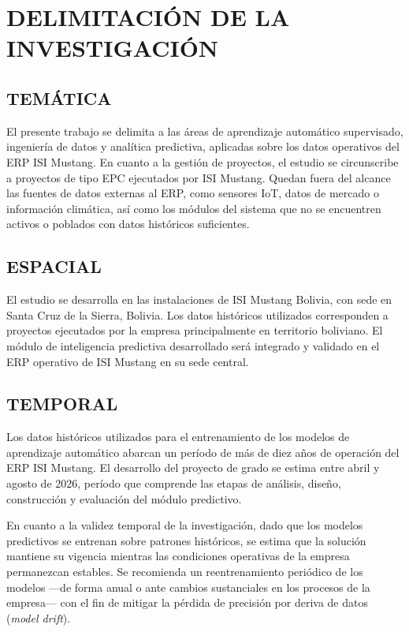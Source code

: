 \documentclass{univalle-perfil}
\begin{document}
\section{DELIMITACIÓN DE LA INVESTIGACIÓN}

\subsection{TEMÁTICA}

El presente trabajo se delimita a las áreas de aprendizaje automático supervisado, ingeniería de datos y analítica predictiva, aplicadas sobre los datos operativos del ERP ISI Mustang. En cuanto a la gestión de proyectos, el estudio se circunscribe a proyectos de tipo EPC ejecutados por ISI Mustang. Quedan fuera del alcance las fuentes de datos externas al ERP, como sensores IoT, datos de mercado o información climática, así como los módulos del sistema que no se encuentren activos o poblados con datos históricos suficientes.

\subsection{ESPACIAL}

El estudio se desarrolla en las instalaciones de ISI Mustang Bolivia, con sede en Santa Cruz de la Sierra, Bolivia. Los datos históricos utilizados corresponden a proyectos ejecutados por la empresa principalmente en territorio boliviano. El módulo de inteligencia predictiva desarrollado será integrado y validado en el ERP operativo de ISI Mustang en su sede central.

\subsection{TEMPORAL}

Los datos históricos utilizados para el entrenamiento de los modelos de aprendizaje automático abarcan un período de más de diez años de operación del ERP ISI Mustang. El desarrollo del proyecto de grado se estima entre abril y agosto de 2026, período que comprende las etapas de análisis, diseño, construcción y evaluación del módulo predictivo.

En cuanto a la validez temporal de la investigación, dado que los modelos predictivos se entrenan sobre patrones históricos, se estima que la solución mantiene su vigencia mientras las condiciones operativas de la empresa permanezcan estables. Se recomienda un reentrenamiento periódico de los modelos —de forma anual o ante cambios sustanciales en los procesos de la empresa— con el fin de mitigar la pérdida de precisión por deriva de datos (\textit{model drift}).
\end{document}
